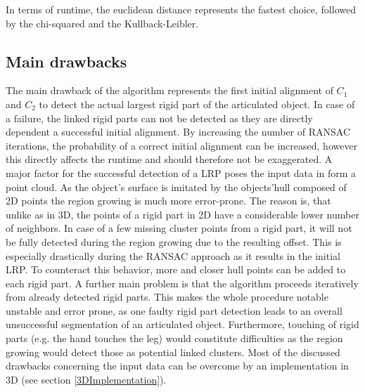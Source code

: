 In terms of runtime, the euclidean distance represents the fastest choice, followed by the chi-squared and the Kullback-Leibler. 
\subsection{Main drawbacks}
The main drawback of the algorithm represents the first initial alignment of $C_1$ and $C_2$ to detect the actual largest rigid part of the articulated object. In case of a failure, the linked rigid parts can not be detected as they are directly dependent a successful initial alignment. By increasing the number of RANSAC iterations, the probability of a correct initial alignment can be increased, however this directly affects the runtime and should therefore not be exaggerated. A major factor for the successful detection of a LRP poses the input data in form a point cloud. As the object's surface is imitated by the objects'hull composed of 2D points the region growing is much more error-prone. The reason is, that unlike as in 3D, the points of a rigid part in 2D have a considerable lower number of neighbors. In case of a few missing cluster points from a rigid part, it will not be fully detected during the region growing due to the resulting offset. This is especially drastically during the RANSAC approach as it results in the initial LRP. To counteract this behavior, more and closer hull points can be added to each rigid part. A further main problem is that the algorithm proceeds iteratively from already detected rigid parts. This makes the whole procedure notable unstable and error prone, as one faulty rigid part detection leads to an overall unsuccessful segmentation of an articulated object. Furthermore, touching of rigid parts (e.g. the hand touches the leg) would constitute difficulties as the region growing would detect those as potential linked clusters. Most of the discussed drawbacks concerning the input data can be overcome by an implementation in 3D (see section \ref{3DImplementation}). 

